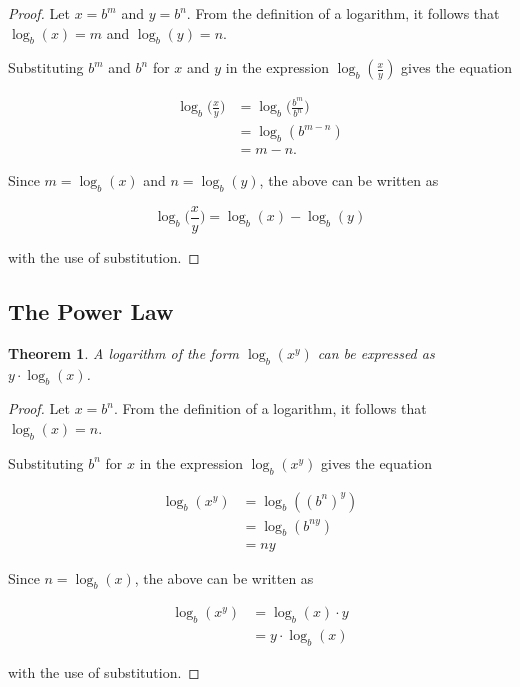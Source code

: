 \documentclass[parskip]{scrartcl}
\newtheorem{theorem}{Theorem}
\begin{document}
\begin{proof}
  Let \(x = b^{m}\) and \(y = b^{n}\). From the definition of a logarithm, it
  follows that \(\log_{b}(x) = m\) and \(\log_{b}(y) = n\).

  Substituting \(b^{m}\) and \(b^{n}\) for \(x\) and \(y\) in the expression
  \(\log_{b}(\frac{x}{y})\) gives the equation

  \begin{equation*}
    \begin{split}
      \log_{b}\big(\frac{x}{y}\big) &= \log_{b}\big(\frac{b^{m}}{b^{n}}\big) \\
      &= \log_{b}(b^{m - n}) \\
      &= m - n.
    \end{split}
  \end{equation*}

  Since \(m = \log_{b}(x)\) and \(n = \log_{b}(y)\), the above can be written as

  \begin{equation*}
    \log_{b}\big(\frac{x}{y}\big) = \log_{b}(x) - \log_{b}(y)
  \end{equation*}

  with the use of substitution.
\end{proof}

\subsection{The Power Law}

\begin{theorem}
  A logarithm of the form \(\log_{b}(x^{y})\) can be expressed as \(y ·
  \log_{b}(x)\).
\end{theorem}

\begin{proof}
  Let \(x = b^{n}\). From the definition of a logarithm, it follows that
  \(\log_{b}(x) = n\).

  Substituting \(b^{n}\) for \(x\) in the expression \(\log_{b}(x^{y})\) gives
  the equation

  \begin{equation*}
    \begin{split}
      \log_{b}(x^{y}) &= \log_{b}({(b^{n})}^{y}) \\
      &= \log_{b}(b^{ny}) \\
      &= ny
    \end{split}
  \end{equation*}

  Since \(n = \log_{b}(x)\), the above can be written as

  \begin{equation*}
    \begin{split}
      \log_{b}(x^{y}) &= \log_{b}(x) · y \\
      &= y · \log_{b}(x)
    \end{split}
  \end{equation*}

  with the use of substitution.
\end{proof}
\end{document}
